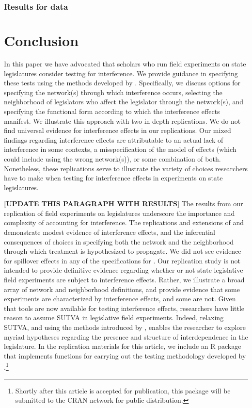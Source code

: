 \documentclass[12pt]{article}
\begin{document}
\subsubsection{Results for \citet{bergan2015call} data}

\section{Conclusion}


In this paper we have advocated that scholars who run field experiments on state legislatures consider testing for interference. We provide guidance in specifying these tests using the methods developed by  \citet{bowers2012reasoning}. Specifically, we discuss options for specifying the network(s) through which interference occurs, selecting the neighborhood of legislators who affect the legislator through the network(s), and specifying the functional form according to which the interference effects manifest. We illustrate this approach with two in-depth replications. We do not find universal evidence for interference effects in our replications. Our mixed findings regarding interference effects are attributable to an actual lack of interference in some contexts, a misspecification of the model of effects (which could include using the wrong network(s)), or some combination of both.  Nonetheless, these replications serve to illustrate the variety of choices researchers have to make when testing for interference effects in experiments on state legislatures. 

{\bf [UPDATE THIS PARAGRAPH WITH RESULTS]}
The results from our replication of field experiments on legislatures underscore the importance and complexity of accounting for interference. The replications and extensions of \citet{coppock2014information} and \citet{broockman2013black} demonstrate modest evidence of interference effects, and the inferential consequences of choices in specifying both the network and the neighborhood through which treatment is hypothesized to propagate. We did not see evidence for spillover effects in any of the specifications for \citet{bergan2015call}.  Our replication study is not intended to provide definitive evidence regarding whether or not state legislative field experiments are subject to interference effects. Rather, we illustrate a broad array of network and neighborhood definitions, and provide evidence that some experiments are characterized by interference effects, and some are not. Given that tools are now available for testing interference effects, researchers have little reason to assume SUTVA in legislative field experiments. Indeed, relaxing SUTVA, and using the methods introduced by \citet{bowers2012reasoning}, enables the researcher to explore myriad hypotheses regarding the presence and structure of interdependence in the legislature. In the replication materials for this article, we include an R package that implements functions for carrying out the testing methodology developed by \citet{bowers2012reasoning}.\footnote{Shortly after this article is accepted for publication, this package will be submitted to the CRAN network for public distribution.}
\end{document}
